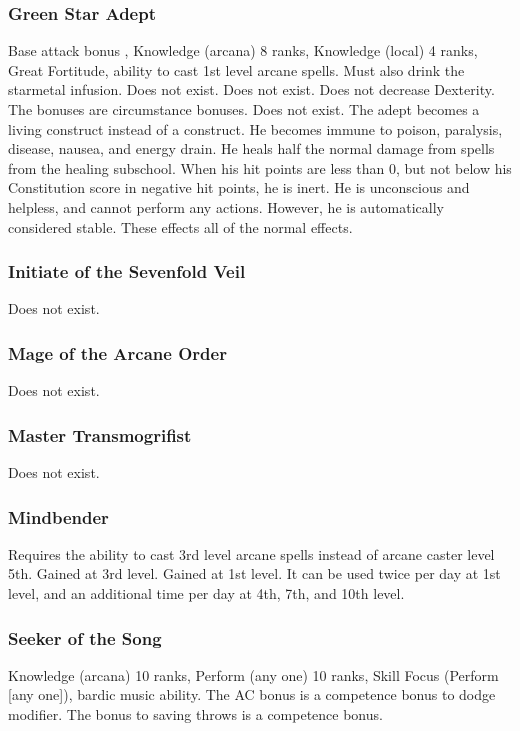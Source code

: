 \subsubsection{Green Star Adept}
 Base attack bonus , Knowledge (arcana) 8 ranks, Knowledge (local) 4 ranks, Great Fortitude, ability to cast 1st level arcane spells. Must also drink the starmetal infusion.
 Does not exist.
 Does not exist.
 Does not decrease Dexterity.
 The bonuses are circumstance bonuses.
 Does not exist.
 The adept becomes a living construct instead of a construct. He becomes immune to poison, paralysis, disease, nausea, and energy drain. He heals half the normal damage from spells from the healing subschool. When his hit points are less than 0, but not below his Constitution score in negative hit points, he is inert. He is unconscious and helpless, and cannot perform any actions. However, he is automatically considered stable. These effects all of the normal effects.
\subsubsection{Initiate of the Sevenfold Veil}
Does not exist.
\subsubsection{Mage of the Arcane Order}
Does not exist.
\subsubsection{Master Transmogrifist}
Does not exist.
\subsubsection{Mindbender}
 Requires the ability to cast 3rd level arcane spells instead of arcane caster level 5th.
 Gained at 3rd level.
 Gained at 1st level. It can be used twice per day at 1st level, and an additional time per day at 4th, 7th, and 10th level.
\subsubsection{Seeker of the Song}
 Knowledge (arcana) 10 ranks, Perform (any one) 10 ranks, Skill Focus (Perform [any one]), bardic music ability.
 The AC bonus is a competence bonus to dodge modifier. The bonus to saving throws is a competence bonus.
